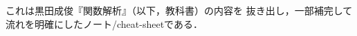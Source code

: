 \documentclass[a4j]{jsarticle}
\begin{document}
    これは黒田成俊『関数解析』（以下，教科書）の内容を
    抜き出し，一部補完して流れを明確にしたノート/cheat-sheetである．

    
    
\end{document}
